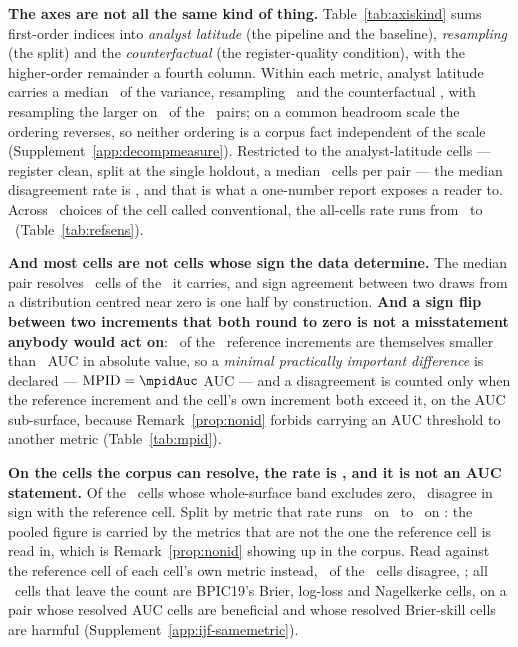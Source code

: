 \textbf{The axes are not all the same kind of thing.}
Table~\ref{tab:axiskind} sums first-order indices into \emph{analyst
latitude} (the pipeline and the baseline), \emph{resampling} (the split) and
the \emph{counterfactual} (the register-quality condition), with the
higher-order remainder a fourth column. Within each metric, analyst latitude
carries a median \shareLatitudePct\ of the variance, resampling
\shareResamplingPct\ and the counterfactual \shareCounterfactualPct, with
resampling the larger on \nPairsResamplingOverLatitude\ of the \nPairs\
pairs; on a common headroom scale the ordering reverses, so neither ordering
is a corpus fact independent of the scale (Supplement~\ref{app:decompmeasure}).
Restricted to the analyst-latitude cells --- register clean, split at the
single holdout, a median \nCellsLatitude\ cells per pair --- the median
disagreement rate is \misreportLatitudePct, and that is what a one-number
report exposes a reader to. Across \nRefSensVariants\ choices of the cell
called conventional, the all-cells rate runs from \refSensMinPct\ to
\refSensMaxPct\ (Table~\ref{tab:refsens}).

\textbf{And most cells are not cells whose sign the data determine.} The
median pair resolves \nResolvedMedian\ cells of the \nCellsPerPairMedian\ it
carries, and sign agreement between two draws from a distribution centred
near zero is one half by construction. \textbf{And a sign flip between two
increments that both round to zero is not a misstatement anybody would act
on}: \nRefBelowMpid\ of the \nPairs\ reference increments are themselves
smaller than \mpidAuc\ AUC in absolute value, so a \emph{minimal practically important
difference} is declared --- $\mathrm{MPID} = \mpidAuc$ AUC --- and a
disagreement is counted only when the reference increment and the cell's own
increment both exceed it, on the AUC sub-surface, because Remark~\ref{prop:nonid}
forbids carrying an AUC threshold to another metric
(Table~\ref{tab:mpid}).

\textbf{On the cells the corpus can resolve, the rate is
\misreportPooledResolvedPct, and it is not an AUC statement.} Of the
\nResolvedCorpus\ cells whose whole-surface band excludes
zero, \nDisagreeResolved\ disagree in sign with the reference cell. Split by
metric that rate runs \misreportResolvedInstrumentMinPct\ on
\instrumentLeastDisagreement\ to \misreportResolvedInstrumentMaxPct\ on
\instrumentMostDisagreement: the pooled figure is carried by the metrics
that are not the one the reference cell is read in, which is
Remark~\ref{prop:nonid} showing up in the corpus. Read against the reference
cell of each cell's own metric instead, \nDisagreeOwnMetric\ of the
\nResolvedCorpus\ cells disagree, \misreportOwnMetricPct; all
\nLeaveBpicNineteenProper\ cells that leave the count are BPIC19's Brier,
log-loss and Nagelkerke cells, on a pair whose resolved AUC cells are beneficial and
whose resolved Brier-skill cells are harmful
(Supplement~\ref{app:ijf-samemetric}).

